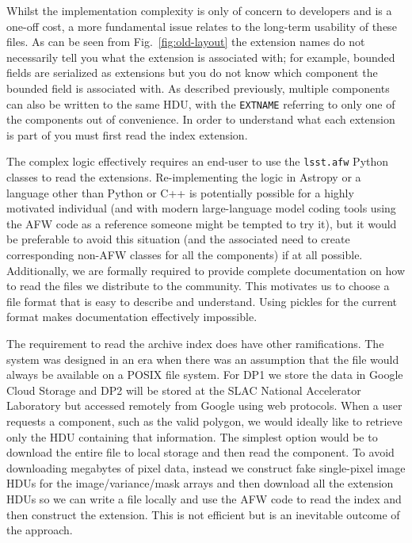 Whilst the implementation complexity is only of concern to developers and is a one-off cost, a more fundamental issue relates to the long-term usability of these files.
As can be seen from Fig.~\ref{fig:old-layout} the extension names do not necessarily tell you what the extension is associated with; for example, bounded fields are serialized as extensions but you do not know which component the bounded field is associated with.
As described previously, multiple components can also be written to the same HDU, with the \texttt{EXTNAME} referring to only one of the components out of convenience.
In order to understand what each extension is part of you must first read the index extension.

The complex logic effectively requires an end-user to use the \texttt{lsst.afw} Python classes to read the extensions.
Re-implementing the logic in Astropy or a language other than Python or C++ is potentially possible for a highly motivated individual (and with modern large-language model coding tools using the AFW code as a reference someone might be tempted to try it), but it would be preferable to avoid this situation (and the associated need to create corresponding non-AFW classes for all the components) if at all possible.
Additionally, we are formally required to provide complete documentation on how to read the files we distribute to the community.
This motivates us to choose a file format that is easy to describe and understand.
Using pickles for the current format makes documentation effectively impossible.

The requirement to read the archive index does have other ramifications.
The system was designed in an era when there was an assumption that the file would always be available on a POSIX file system.
For DP1 we store the data in Google Cloud Storage and DP2 will be stored at the SLAC National Accelerator Laboratory but accessed remotely from Google\cite{2024SPIE13101E..2BO} using web protocols.
When a user requests a component, such as the valid polygon, we would ideally like to retrieve only the HDU containing that information.
The simplest option would be to download the entire file to local storage and then read the component.
To avoid downloading megabytes of pixel data, instead we construct fake single-pixel image HDUs for the image/variance/mask arrays and then download all the extension HDUs so we can write a file locally and use the AFW code to read the index and then construct the extension.
This is not efficient but is an inevitable outcome of the approach.

